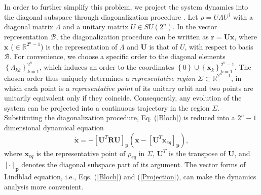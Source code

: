 \documentclass[prl,aps,twocolumn, reprint, amsmath,amssymb,showpacs,superscriptaddress]{revtex4}
\begin{document}
In order to further simplify this problem, we project the system dynamics into the diagonal subspace through diagonalization procedure \cite{Y, RBR}. Let $\rho = U \Lambda U^\dag$ with a diagonal matrix $\Lambda$ and a unitary matrix $U \in SU(2^n)$. In the vector representation $\mathcal{B}$, the diagonalization procedure can be written as $\bm{r} = \mathbf{U} \bm{x}$, where $\bm{x}$ ($ \in \mathbb{R}^{2^n -1}$) is the representation of $\Lambda$ and $\mathbf{U}$ is that of $U$, with respect to basis $\mathcal{B}$. For convenience, we choose a specific order to the diagonal elements ${\left\{ {{\Lambda _{kk}}} \right\}_{k = 1}^{2^n}}$, which induces an order to the coordinates $\left\{ 0 \right\} \cup {\left\{ {{\bm{x}_k}} \right\}_{k = 1}^{2^{n }- 1}}$. The chosen order thus uniquely determines a \emph{representative region} $\Sigma \subset \mathbb{R}^{2^n -1}$, in which each point is a \emph{representative point} of its unitary orbit and two points are unitarily equivalent only if they coincide.
Consequently, any evolution of the system can be projected into a continuous trajectory in the region $\Sigma$. Substituting the diagonalization procedure, Eq. (\ref{Bloch}) is reduced into a $2^n -1$ dimensional dynamical equation \cite{Y}
\begin{equation}
\label{Projection}
\bm{\dot x} = - {\left[ {{\mathbf{U}^T}\mathbf{R}\mathbf{U}} \right]_\mathbf{p}}(\bm{x} - \left[ {\mathbf{U}^T}{\bm{x}_{eq}}\right]_\mathbf{p}),
\end{equation}
where $\bm{x}_{eq}$ is the representative point of $\rho_{eq}$ in $\Sigma$, ${\mathbf{U}^T}$ is the transpose of ${\mathbf{U}}$, and $[\cdot]_\mathbf{p}$ denotes the diagonal subspace part of its argument.
The vector forms of Lindblad equation, i.e., Eqs. (\ref{Bloch}) and (\ref{Projection}), can make the dynamics analysis more convenient.
\end{document}
